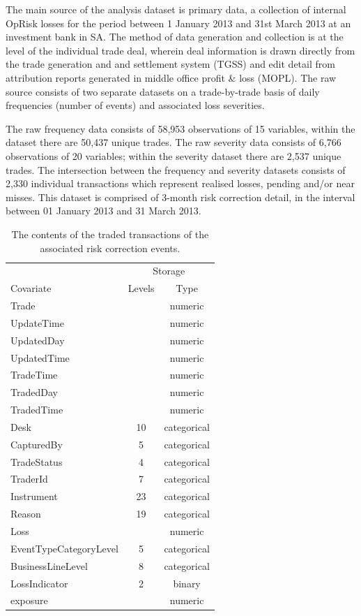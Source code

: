 \documentclass[]{DissertateUSU}
\begin{document}
The main source of the analysis dataset is primary data, a collection of
internal OpRisk losses for the period between 1 January 2013 and 31st
March 2013 at an investment bank in SA. The method of data generation
and collection is at the level of the individual trade deal, wherein
deal information is drawn directly from the trade generation and and
settlement system (TGSS) and edit detail from attribution reports
generated in middle office profit \& loss (MOPL). The raw source
consists of two separate datasets on a trade-by-trade basis of daily
frequencies (number of events) and associated loss severities.\medskip

The raw frequency data consists of 58,953 observations of 15 variables,
within the dataset there are 50,437 unique trades. The raw severity data
consists of 6,766 observations of 20 variables; within the severity
dataset there are 2,537 unique trades. The intersection between the
frequency and severity datasets consists of 2,330 individual
transactions which represent realised losses, pending and/or near
misses. This dataset is comprised of 3-month risk correction detail, in
the interval between 01 January 2013 and 31 March 2013. \medskip

\begin{table}[ht]
\centering
\caption{The contents of the traded transactions of the associated risk correction events.}
\begin{tabular}{lcc}
\toprule
  & \multicolumn{2}{c}{Storage} \\
Covariate     & Levels   & Type \\ 
\midrule
 Trade       &          & numeric \\
 UpdateTime  &          & numeric \\
 UpdatedDay  &          & numeric \\
 UpdatedTime &          & numeric \\
 TradeTime   &          & numeric \\
 TradedDay   &          & numeric \\
 TradedTime  &          & numeric \\
 Desk        &  10      & categorical \\
 CapturedBy  &  5       & categorical \\
 TradeStatus &  4       & categorical \\
 TraderId    &  7       & categorical \\
 Instrument  &  23      & categorical \\
 Reason      &  19      & categorical \\
 Loss        &          & numeric \\
 EventTypeCategoryLevel & 5  & categorical \\
 BusinessLineLevel      & 8  & categorical \\
 LossIndicator          & 2  & binary \\
 exposure               &    & numeric \\
 \bottomrule
\end{tabular}\label{tab_contents}
\end{table}
\end{document}
